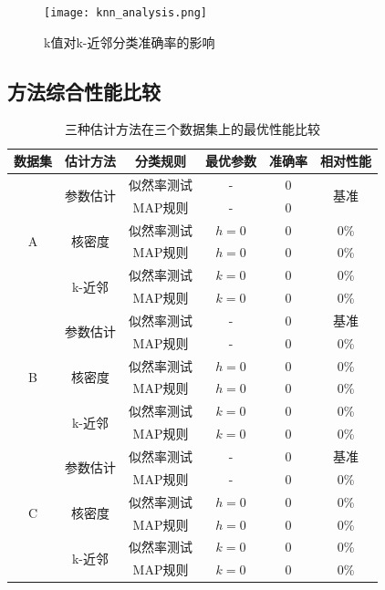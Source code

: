 \documentclass[12pt]{article}
\begin{document}
\begin{figure}[htbp]
\centering
\texttt{[image: knn\_analysis.png]}
\caption{k值对k-近邻分类准确率的影响}
\label{fig:knn_analysis}
\end{figure}



\subsection{方法综合性能比较}

\begin{table}[htbp]
\centering
\caption{三种估计方法在三个数据集上的最优性能比较}
\begin{tabular}{cccccc}
\toprule
数据集 & 估计方法 & 分类规则 & 最优参数 & 准确率 & 相对性能 \\
\midrule
\multirow{6}{*}{A} & \multirow{2}{*}{参数估计} & 似然率测试 & - & 0 & \multirow{2}{*}{基准} \\
& & MAP规则 & - & 0 & \\
\cmidrule{2-6}
& \multirow{2}{*}{核密度} & 似然率测试 & $h=0$ & 0 & 0\% \\
& & MAP规则 & $h=0$ & 0 & 0\% \\
\cmidrule{2-6}
& \multirow{2}{*}{k-近邻} & 似然率测试 & $k=0$ & 0 & 0\% \\
& & MAP规则 & $k=0$ & 0 & 0\% \\
\midrule
\multirow{6}{*}{B} & \multirow{2}{*}{参数估计} & 似然率测试 & - & 0 & 基准 \\
& & MAP规则 & - & 0 & 0\% \\
\cmidrule{2-6}
& \multirow{2}{*}{核密度} & 似然率测试 & $h=0$ & 0 & 0\% \\
& & MAP规则 & $h=0$ & 0 & 0\% \\
\cmidrule{2-6}
& \multirow{2}{*}{k-近邻} & 似然率测试 & $k=0$ & 0 & 0\% \\
& & MAP规则 & $k=0$ & 0 & 0\% \\
\midrule
\multirow{6}{*}{C} & \multirow{2}{*}{参数估计} & 似然率测试 & - & 0 & 基准 \\
& & MAP规则 & - & 0 & 0\% \\
\cmidrule{2-6}
& \multirow{2}{*}{核密度} & 似然率测试 & $h=0$ & 0 & 0\% \\
& & MAP规则 & $h=0$ & 0 & 0\% \\
\cmidrule{2-6}
& \multirow{2}{*}{k-近邻} & 似然率测试 & $k=0$ & 0 & 0\% \\
& & MAP规则 & $k=0$ & 0 & 0\% \\
\bottomrule
\end{tabular}
\end{table}
\end{document}
